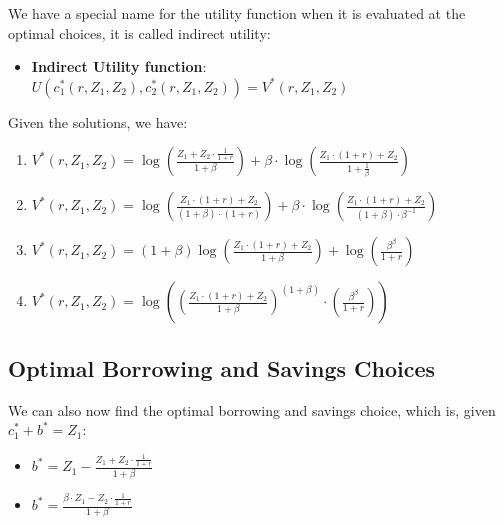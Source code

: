 \documentclass[
]{book}
\providecommand{\tightlist}{%
  \setlength{\itemsep}{0pt}\setlength{\parskip}{0pt}}
\begin{document}
We have a special name for the utility function when it is evaluated at
the optimal choices, it is called indirect utility:

\begin{itemize}
\tightlist
\item
  \textbf{Indirect Utility function}:
  \(U(c_1^{\ast } (r,Z_1 ,Z_2 ),c_2^{\ast } (r,Z_1 ,Z_2 ))=V^{\ast } (r,Z_1 ,Z_2 )\)
\end{itemize}

Given the solutions, we have:

\begin{enumerate}
\def\labelenumi{\arabic{enumi}.}
\item
  \(\displaystyle V^{\ast } (r,Z_1 ,Z_2 )=\log \left(\frac{Z_1 +Z_2 \cdot \frac{1}{1+r}}{1+\beta }\right)+\beta \cdot \log \left(\frac{Z_1 \cdot (1+r)+Z_2 }{1+\frac{1}{\beta }}\right)\)
\item
  \(\displaystyle V^{\ast } (r,Z_1 ,Z_2 )=\log \left(\frac{Z_1 \cdot \left(1+r\right)+Z_2 }{\left(1+\beta \right)\cdot \left(1+r\right)}\right)+\beta \cdot \log \left(\frac{Z_1 \cdot (1+r)+Z_2 }{\left(1+\beta \right)\cdot \beta^{-1} }\right)\)
\item
  \(\displaystyle V^{\ast } (r,Z_1 ,Z_2 )=\left(1+\beta \right)\log \left(\frac{Z_1 \cdot \left(1+r\right)+Z_2 }{1+\beta }\right)+\log \left(\frac{\beta^{\beta } }{1+r}\right)\)
\item
  \(\displaystyle V^{\ast } (r,Z_1 ,Z_2 )=\log \left({\left(\frac{Z_1 \cdot \left(1+r\right)+Z_2 }{1+\beta }\right)}^{\left(1+\beta \right)} \cdot \left(\frac{\beta^{\beta } }{1+r}\right)\right)\)
\end{enumerate}

\hypertarget{optimal-borrowing-and-savings-choices}{%
\subsection{Optimal Borrowing and Savings Choices}\label{optimal-borrowing-and-savings-choices}}

We can also now find the optimal borrowing and savings choice, which is,
given \(c_1^{\ast } +b^{\ast } =Z_1\):

\begin{itemize}
\item
  \(\displaystyle b^{\ast } =Z_1 -\frac{Z_1 +Z_2 \cdot \frac{1}{1+r}}{1+\beta }\)
\item
  \(\displaystyle b^{\ast } =\frac{\beta \cdot Z_1 -Z_2 \cdot \frac{1}{1+r}}{1+\beta }\)
\end{itemize}
\end{document}

